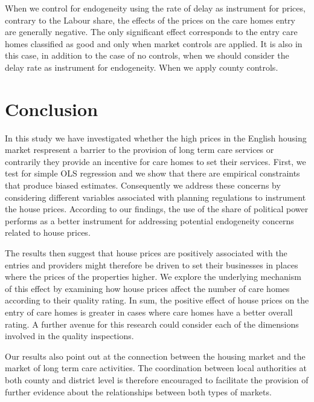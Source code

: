 \documentclass[12pt,letterpaper]{article}
\begin{document}
When we control for endogeneity using the rate of delay as instrument for prices,
 contrary to the Labour share, the effects of the prices on the care homes entry
  are generally negative. The only significant effect 
  corresponds to the entry care homes classified as good and
   only when market controls are applied. It is also in this case,
    in addition to the case of no controls, when we should consider
     the delay rate as instrument for endogeneity. When we apply county controls. 


\section{Conclusion}

In this study we have investigated whether the high prices in the English housing market respresent a barrier to
 the provision of long term care services or contrarily they provide an incentive for care homes to set their 
 services. First, we test for simple OLS regression and we show that there are empirical constraints that produce
  biased estimates. Consequently we address these concerns by considering different variables associated with
    planning regulations to instrument the house prices. According to our findings, the use of the share of political
     power performs as a better instrument for addressing potential endogeneity concerns related to house prices.
       
       The results then suggest that house prices are positively associated with the entries and providers might
        therefore be driven to set their businesses in places where the prices of the properties higher. We explore 
        the underlying mechanism of this effect by examining how house prices affect the number of care 
        homes according to their quality rating. In sum, the positive effect of house prices on the entry of care
         homes is greater in cases where care homes have a better overall rating. A further avenue for this research
          could consider each of the dimensions involved in the quality inspections. 
          
Our results also point out at the connection between the housing market and the
 market of long term care activities. The coordination between local authorities at
  both county and district level is therefore encouraged to facilitate the provision of 
  further evidence about the relationships between both types of markets. 


\newpage


\end{document}

